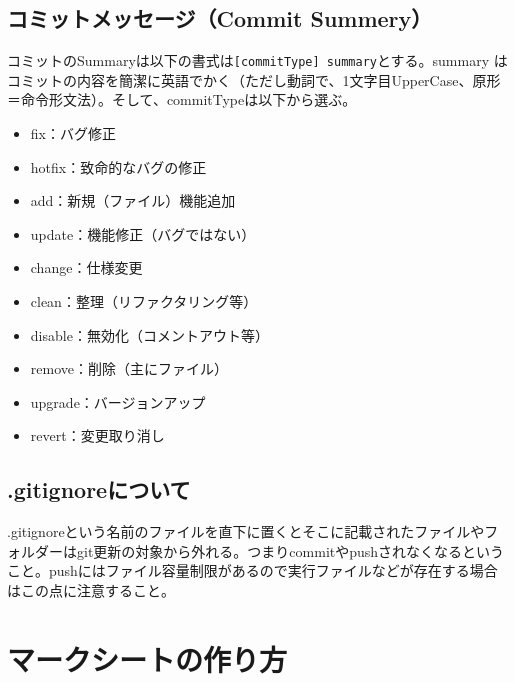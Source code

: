 \documentclass[dvipdfmx,jb5]{jarticle}
\begin{document}
 \subsection{コミットメッセージ（Commit Summery）}
 コミットのSummaryは以下の書式は\verb|[commitType] summary|とする。summary はコミットの内容を簡潔に英語でかく（ただし動詞で、1文字目UpperCase、原形＝命令形文法）。そして、commitTypeは以下から選ぶ。

\begin{itemize}
\item fix：バグ修正　
\item hotfix：致命的なバグの修正
\item add：新規（ファイル）機能追加
\item update：機能修正（バグではない）
\item change：仕様変更
\item clean：整理（リファクタリング等）
\item disable：無効化（コメントアウト等）
\item remove：削除（主にファイル）
\item upgrade：バージョンアップ
\item revert：変更取り消し
\end{itemize}
\subsection{.gitignoreについて}\label{sec:gitignore}
.gitignoreという名前のファイルを直下に置くとそこに記載されたファイルやフォルダーはgit更新の対象から外れる。つまりcommitやpushされなくなるということ。pushにはファイル容量制限があるので実行ファイルなどが存在する場合はこの点に注意すること。
\section{マークシートの作り方}
\end{document}
